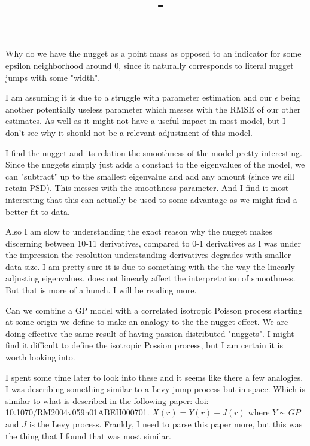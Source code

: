\documentclass[answers,12pt,addpoints]{exam}
\author{\name}
\title{\course \ - \assignment}
\begin{document}
\maketitle

\newpage
\begin{questions}
\question Why do we have the nugget as a point mass as opposed to an indicator for some epsilon neighborhood around 0, since it naturally corresponds to literal nugget jumps with some "width".

I am assuming it is due to a struggle with parameter estimation and our $\epsilon$ being another potentially useless parameter which messes with the RMSE of our other estimates. As well as it might not have a useful impact in most model, but I don't see why it should not be a relevant adjustment of this model. 

\question I find the nugget and its relation the smoothness of the model pretty interesting. Since the nuggets simply just adds a constant to the eigenvalues of the model, we can "subtract" up to the smallest eigenvalue and add any amount (since we sill retain PSD). This messes with the smoothness parameter. And I find it most interesting that this can actually be used to some advantage as we might find a better fit to data.

Also I am slow to understanding the exact reason why the nugget makes discerning between 10-11 derivatives, compared to 0-1 derivatives as I was under the impression the resolution understanding derivatives degrades with smaller data size. I am pretty sure it is due to something with the the way the linearly adjusting eigenvalues, does not linearly affect the interpretation of smoothness. But that is more of a hunch. I will be reading more.

\question Can we combine a GP model with a correlated isotropic Poisson process starting at some origin we define to make an analogy to the the nugget effect. We are doing effective the same result of having passion distributed "nuggets". I might find it difficult to define the isotropic Possion process, but I am certain it is worth looking into. 

I spent some time later to look into these and it seems like there a few analogies. I was describing something similar to a Levy jump process but in space. Which is similar to what is described in the following paper: doi: 10.1070/RM2004v059n01ABEH000701. $X(r) = Y(r) + J(r)$ where $Y \sim GP$ and $J$ is the Levy process. Frankly, I need to parse this paper more, but this was the thing that I found that was most similar.


\end{questions}
\end{document}

